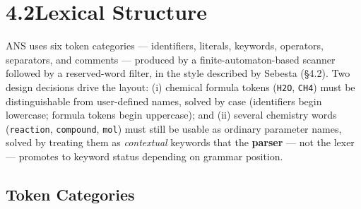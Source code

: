 \documentclass[11pt,a4paper]{article}
\newcommand{\code}[1]{\texttt{#1}}
\begin{document}
\newpage
\section{4.2\quad Lexical Structure}

ANS uses six token categories --- identifiers, literals, keywords, operators, separators, and comments --- produced by a finite-automaton-based scanner followed by a reserved-word filter, in the style described by Sebesta (\S4.2). Two design decisions drive the layout: (i) chemical formula tokens (\code{H2O}, \code{CH4}) must be distinguishable from user-defined names, solved by case (identifiers begin lowercase; formula tokens begin uppercase); and (ii) several chemistry words (\code{reaction}, \code{compound}, \code{mol}) must still be usable as ordinary parameter names, solved by treating them as \textit{contextual} keywords that the \textbf{parser} --- not the lexer --- promotes to keyword status depending on grammar position.

\subsection{Token Categories}
\end{document}
